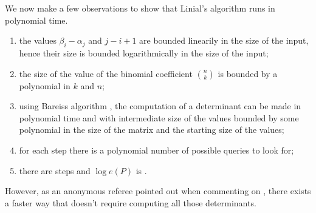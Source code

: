 We now make a few observations to show that Linial's algorithm runs in
polynomial time.

\begin{enumerate}
\item the values \(\beta_i - \alpha_j\) and \(j - i + 1\) are bounded
linearily in the size of the input, hence their size is bounded
logarithmically in the size of the input;
\item the size of the value of the binomial coefficient \(\binom{n}{k}\) is
bounded by a polynomial in \(k\) and \(n\);
\item using Bareiss algorithm \cite{bareiss:1968}, the computation of a
determinant can be made in polynomial time and with intermediate size of the
values bounded by some polynomial in the size of the matrix and the starting
size of the values;
\item for each step there is a polynomial number of possible queries to look for;
\item there are  steps and \(\log e(P)\) is .
\end{enumerate}

However, as an anonymous referee pointed out when commenting on
\cite{cardinal:2013}, there exists a faster way that doesn't require computing
all those determinants.
